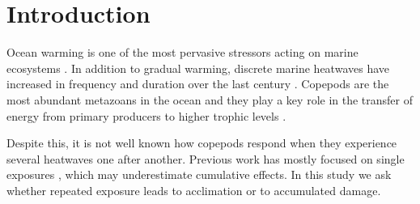 \section{Introduction}
\label{sec:intro}

Ocean warming is one of the most pervasive stressors acting on marine ecosystems \citep{hobday2016}.
In addition to gradual warming, discrete marine heatwaves have increased in frequency and duration over the last century \citep{oliver2018}.
Copepods are the most abundant metazoans in the ocean and they play a key role in the transfer of energy from primary producers to higher trophic levels \citep{turner2004}.

Despite this, it is not well known how copepods respond when they experience several heatwaves one after another.
Previous work has mostly focused on single exposures \citep{missingref2020}, which may underestimate cumulative effects.
In this study we ask whether repeated exposure leads to acclimation or to accumulated damage.
